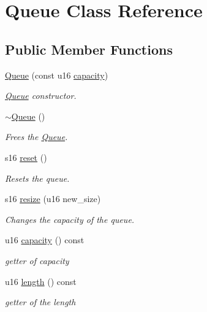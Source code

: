\hypertarget{class_queue}{}\section{Queue Class Reference}
\label{class_queue}
\subsection*{Public Member Functions}
\begin{DoxyCompactItemize}
\item 
\hyperlink{class_queue_a2d54628be4dd884dca80d007cf80ae34}{Queue} (const u16 \hyperlink{class_queue_a5ebe9fb9d055ad459c36142ff64df055}{capacity})
\begin{DoxyCompactList}\small\item\em \hyperlink{class_queue}{Queue} constructor. \end{DoxyCompactList}\item 
\hyperlink{class_queue_a00d119db8fa3050da37746e82cbcf94f}{$\sim$\+Queue} ()
\begin{DoxyCompactList}\small\item\em Frees the \hyperlink{class_queue}{Queue}. \end{DoxyCompactList}\item 
s16 \hyperlink{class_queue_ad4f19940d14d343cf98a6fc3ba291079}{reset} ()
\begin{DoxyCompactList}\small\item\em Resets the queue. \end{DoxyCompactList}\item 
s16 \hyperlink{class_queue_a47db3b18ecaae98ec954352ef911b171}{resize} (u16 new\+\_\+size)
\begin{DoxyCompactList}\small\item\em Changes the capacity of the queue. \end{DoxyCompactList}\item 
u16 \hyperlink{class_queue_a5ebe9fb9d055ad459c36142ff64df055}{capacity} () const
\begin{DoxyCompactList}\small\item\em getter of capacity \end{DoxyCompactList}\item 
u16 \hyperlink{class_queue_a4a4164d32375aa63b92d2b86963f0cd8}{length} () const
\begin{DoxyCompactList}\small\item\em getter of the length \end{DoxyCompactList}\item 

\end{DoxyCompactItemize}
